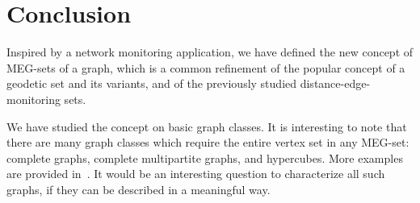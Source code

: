 \documentclass[10pt,a4paper]{article}
\begin{document}

\section{Conclusion}\label{sec:conclu}

Inspired by a network monitoring application, we have defined the new concept of MEG-sets of a graph, which is a common refinement of the popular concept of a geodetic set and its variants, and of the previously studied distance-edge-monitoring sets.

We have studied the concept on basic graph classes. It is interesting to note that there are many graph classes which require the entire vertex set in any MEG-set: complete graphs, complete multipartite graphs, and hypercubes. More examples are provided in~\cite{H23}. It would be an interesting question to characterize all such graphs, if they can be described in a meaningful way.
\end{document}
